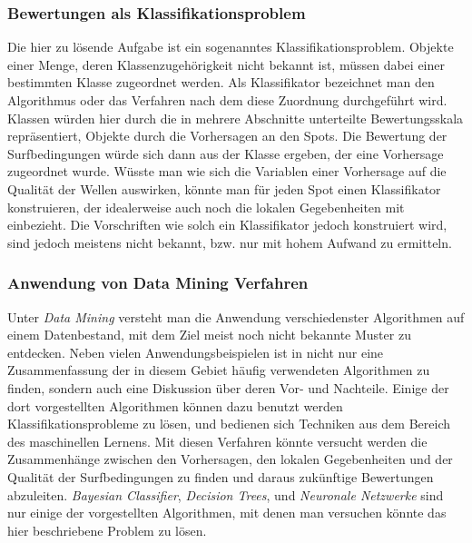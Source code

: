 \subsubsection{Bewertungen als Klassifikationsproblem}
Die hier zu lösende Aufgabe ist ein sogenanntes
Klassifikationsproblem. Objekte einer Menge, deren
Klassenzugehörigkeit nicht bekannt ist, müssen dabei einer bestimmten
Klasse zugeordnet werden. Als Klassifikator bezeichnet man den
Algorithmus oder das Verfahren nach dem diese Zuordnung durchgeführt
wird. Klassen würden hier durch die in mehrere Abschnitte unterteilte
Bewertungsskala repräsentiert, Objekte durch die Vorhersagen an den
Spots. Die Bewertung der Surfbedingungen würde sich dann aus der
Klasse ergeben, der eine Vorhersage zugeordnet wurde. Wüsste man wie
sich die Variablen einer Vorhersage auf die Qualität der Wellen
auswirken, könnte man für jeden Spot einen Klassifikator konstruieren,
der idealerweise auch noch die lokalen Gegebenheiten mit
einbezieht. Die Vorschriften wie solch ein Klassifikator jedoch
konstruiert wird, sind jedoch meistens nicht bekannt, bzw. nur mit
hohem Aufwand zu ermitteln.

\subsubsection{Anwendung von Data Mining Verfahren}
Unter \textit{Data Mining} versteht man die Anwendung verschiedenster
Algorithmen auf einem Datenbestand, mit dem Ziel meist noch nicht
bekannte Muster zu entdecken. Neben vielen Anwendungsbeispielen ist in
\cite{Seagaran2007} nicht nur eine Zusammenfassung der in diesem
Gebiet häufig verwendeten Algorithmen zu finden, sondern auch eine
Diskussion über deren Vor- und Nachteile. Einige der dort
vorgestellten Algorithmen können dazu benutzt werden
Klassifikationsprobleme zu lösen, und bedienen sich Techniken aus dem
Bereich des maschinellen Lernens. Mit diesen Verfahren könnte versucht
werden die Zusammenhänge zwischen den Vorhersagen, den lokalen
Gegebenheiten und der Qualität der Surfbedingungen zu finden und
daraus zukünftige Bewertungen abzuleiten. \textit{Bayesian
  Classifier}, \textit{Decision Trees}, und \textit{Neuronale
  Netzwerke} sind nur einige der vorgestellten Algorithmen, mit denen
man versuchen könnte das hier beschriebene Problem zu lösen.

